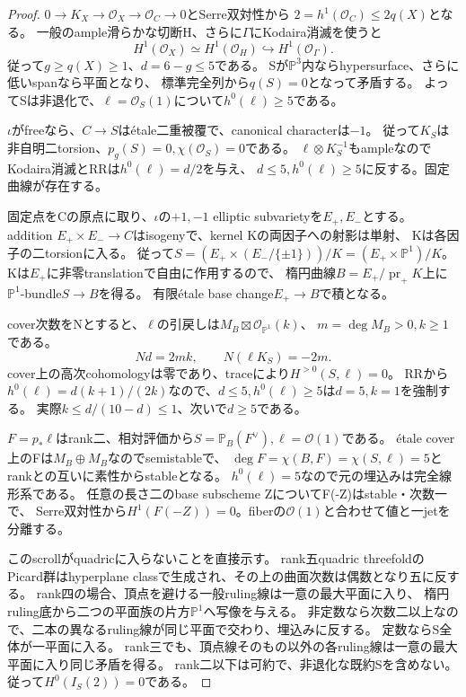 \documentclass[a4paper,11pt]{ltjsarticle}
\theoremstyle{definition}
\begin{document}
\begin{proof}
$0\to K_X\to\mathcal O_X\to\mathcal O_C\to0$とSerre双対性から
$2=h^1(\mathcal O_C)\le2q(X)$となる。
一般のample滑らかな切断H、さらに$\Gamma$にKodaira消滅を使うと
\[
 H^1(\mathcal O_X)\simeq H^1(\mathcal O_H)
       \hookrightarrow H^1(\mathcal O_\Gamma).
\]
従って$g\ge q(X)\ge1$、$d=6-g\le5$である。
Sが$\mathbb P^3$内ならhypersurface、さらに低いspanなら平面となり、
標準完全列から$q(S)=0$となって矛盾する。
よってSは非退化で、$\ell=\mathcal O_S(1)$について$h^0(\ell)\ge5$である。

$\iota$がfreeなら、$C\to S$はétale二重被覆で、canonical characterは$-1$。
従って$K_S$は非自明二torsion、$p_g(S)=0,\chi(\mathcal O_S)=0$である。
$\ell\otimes K_S^{-1}$もampleなのでKodaira消滅とRRは$h^0(\ell)=d/2$を与え、
$d\le5,h^0(\ell)\ge5$に反する。固定曲線が存在する。

固定点をCの原点に取り、$\iota$の$+1,-1$ elliptic subvarietyを$E_+,E_-$とする。
addition $E_+\times E_-\to C$はisogenyで、kernel Kの両因子への射影は単射、
Kは各因子の二torsionに入る。
従って$S=(E_+\times(E_-/\{\pm1\}))/K=(E_+\times\mathbb P^1)/K$。
Kは$E_+$に非零translationで自由に作用するので、
楕円曲線$B=E_+/\operatorname{pr}_+K$上に$\mathbb P^1$-bundle$S\to B$を得る。
有限étale base change$E_+\to B$で積となる。

cover次数をNとすると、$\ell$の引戻しは$M_B\boxtimes\mathcal O_{\mathbb P^1}(k)$、
$m=\deg M_B>0,k\ge1$である。
\[
 Nd=2mk,\qquad N(\ell K_S)=-2m.
\]
cover上の高次cohomologyは零であり、traceにより$H^{>0}(S,\ell)=0$。
RRから$h^0(\ell)=d(k+1)/(2k)$なので、$d\le5,h^0(\ell)\ge5$は$d=5,k=1$を強制する。
実際$k\le d/(10-d)\le1$、次いで$d\ge5$である。

$F=p_*\ell$はrank二、相対評価から$S=\mathbb P_B(F^\vee),\ell=\mathcal O(1)$である。
étale cover上のFは$M_B\oplus M_B$なのでsemistableで、
$\deg F=\chi(B,F)=\chi(S,\ell)=5$とrankとの互いに素性からstableとなる。
$h^0(\ell)=5$なので元の埋込みは完全線形系である。
任意の長さ二のbase subscheme ZについてF(-Z)はstable・次数一で、
Serre双対性から$H^1(F(-Z))=0$。fiberの$\mathcal O(1)$と合わせて値と一jetを分離する。

このscrollがquadricに入らないことを直接示す。
rank五quadric threefoldのPicard群はhyperplane classで生成され、その上の曲面次数は偶数となり五に反する。
rank四の場合、頂点を避ける一般ruling線は一意の最大平面に入り、
楕円ruling底から二つの平面族の片方$\mathbb P^1$へ写像を与える。
非定数なら次数二以上なので、二本の異なるruling線が同じ平面で交わり、埋込みに反する。
定数ならS全体が一平面に入る。
rank三でも、頂点線そのもの以外の各ruling線は一意の最大平面に入り同じ矛盾を得る。
rank二以下は可約で、非退化な既約Sを含めない。従って$H^0(I_S(2))=0$である。


\end{proof}
\end{document}
